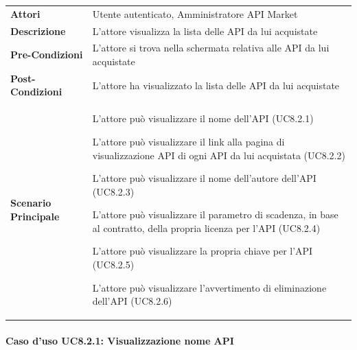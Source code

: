 \begin{minipage}{\linewidth}
	\begin{tabular}{ l | p{11cm}}
		\hline
		\rowcolor{Gray}
		\multicolumn{2}{c}{UC8.2 - Visualizzazione lista API acquistate} \\
		\hline
		\textbf{Attori} & Utente autenticato, Amministratore API Market \\
		\textbf{Descrizione} & L'attore visualizza la lista delle API da lui acquistate \\
		\textbf{Pre-Condizioni} & L'attore si trova nella schermata relativa alle API da lui acquistate \\
		\textbf{Post-Condizioni} & L'attore ha visualizzato la lista delle API da lui acquistate \\
		\textbf{Scenario Principale} & 
		\begin{enumerate*}[label=(\arabic*.),itemjoin={\newline}]
			\item L'attore può visualizzare il nome dell'API (UC8.2.1)
			\item L'attore può visualizzare il link alla pagina di visualizzazione API di ogni API da lui acquistata (UC8.2.2)
			\item L'attore può visualizzare il nome dell'autore dell'API (UC8.2.3)
			\item L'attore può visualizzare il parametro di scadenza, in base al contratto,  della propria licenza per l'API (UC8.2.4)
			\item L'attore può visualizzare la propria chiave per l'API (UC8.2.5)
			\item L'attore può visualizzare l'avvertimento di eliminazione dell'API (UC8.2.6)
		\end{enumerate*}\\
	\end{tabular}
\end{minipage}

\paragraph{Caso d'uso UC8.2.1: Visualizzazione nome API}
\label{UC8_2_1}

